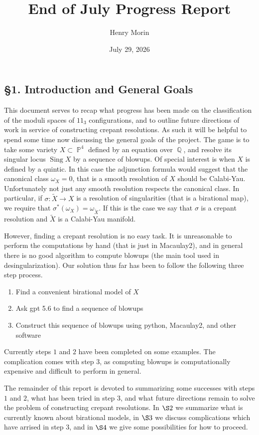 \documentclass{article}
\title{End of July Progress Report}
\author{Henry Morin}
\date{July 29, 2026}
\DeclareMathOperator{\QQ}{\mathbb{Q}}
\DeclareMathOperator{\PP}{\mathbb{P}}
\DeclareMathOperator{\Sing}{\text{Sing}}
\begin{document}
\maketitle

\subsection*{\S 1. Introduction and General Goals}

This document serves to recap what progress has been made on the classification of the moduli spaces of $11_3$ configurations, and to outline future directions of work in service of constructing crepant resolutions. As such it will be helpful to spend some time now discussing the general goals of the project. The game is to take some variety $X \subset \PP^4$ defined by an equation over $\QQ$, and resolve its singular locus $\Sing X$ by a sequence of blowups. Of special interest is when $X$ is defined by a quintic. In this case the adjunction formula would suggest that the canonical class $\omega_X = 0$, that is a smooth resolution of $X$ should be Calabi-Yau. Unfortunately not just any smooth resolution respects the canonical class. In particular, if $\sigma : \widetilde{X} \to X$ is a resolution of singularities (that is a birational map), we require that $\sigma^*(\omega_X) = \omega_{\widetilde{X}}$. If this is the case we say that $\sigma$ is a crepant resolution and $\widetilde{X}$ is a Calabi-Yau manifold.

However, finding a crepant resolution is no easy task. It is unreasonable to perform the computations by hand (that is just in Macaulay2), and in general there is no good algorithm to compute blowups (the main tool used in desingularization). Our solution thus far has been to follow the following three step process.
\begin{enumerate}
\item Find a convenient birational model of $X$
\item Ask gpt 5.6 to find a sequence of blowups
\item Construct this sequence of blowups using python, Macaulay2, and other software
\end{enumerate}
Currently steps $1$ and $2$ have been completed on some examples. The complication comes with step $3$, as computing blowups is computationally expensive and difficult to perform in general. 

The remainder of this report is devoted to summarizing some successes with steps $1$ and $2$, what has been tried in step $3$, and what future directions remain to solve the problem of constructing crepant resolutions. In $\S 2$ we summarize what is currently known about birational models, in $\S 3$ we discuss complications which have arrised in step $3$, and in $\S 4$ we give some possibilities for how to proceed.
\end{document}
